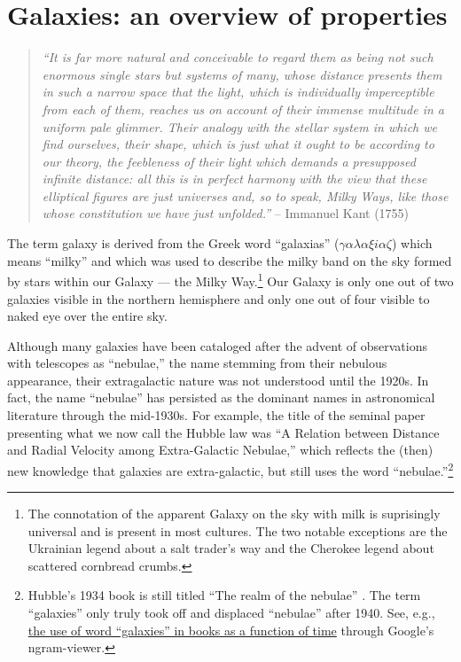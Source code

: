 \chapter{Galaxies: an overview of properties}
\label{ch:overview}
\begin{quote}
{\it “It is far more natural and conceivable to regard them as being not such enormous single stars but systems of many, whose distance presents them in such a narrow space that the light, which is individually imperceptible from each of them, reaches us on account of their immense multitude in a uniform pale glimmer. Their analogy with the stellar system in which we find ourselves, their shape, which is just what it ought to be according to our theory, the feebleness of their light which demands a presupposed infinite distance: all this is in perfect harmony with the view that these elliptical figures are just universes and, so to speak, Milky Ways, like those whose constitution we have just unfolded.”}  -- Immanuel Kant (1755)
\end{quote}

The term galaxy is derived from the Greek word ``galaxias'' ($\gamma\alpha\lambda\alpha\xi i\alpha\zeta$) which means ``milky'' and which was used to describe the milky band on the sky formed by stars within our Galaxy --- the Milky Way.\footnote{The connotation of the apparent Galaxy on the sky with milk is suprisingly universal and is present in most cultures. The two notable exceptions are the Ukrainian legend about a salt trader's way and the Cherokee legend about scattered cornbread crumbs. } Our Galaxy is only one out of two galaxies visible in the northern hemisphere and only one out of four visible to naked eye over the entire sky. 

Although many galaxies have been cataloged after the advent of observations with telescopes as ``nebulae,'' the name stemming from their nebulous appearance, their extragalactic nature was not understood until the 1920s. In fact, the name ``nebulae'' has persisted as the dominant names in astronomical literature through the mid-1930s. For example, the title of the seminal \href{http://adsabs.harvard.edu/abs/1929PNAS...15..168H}{\citet{hubble29}} paper presenting what we now call the Hubble law was  ``A Relation between Distance and Radial Velocity among Extra-Galactic Nebulae,'' which 
reflects the (then) new knowledge that galaxies are extra-galactic, but still uses the word ``nebulae.''\footnote{Hubble's 1934 book is still titled ``The realm of the nebulae'' \citep{hubble34}. The term ``galaxies'' only truly took off and displaced ``nebulae'' after 1940. See, e.g., \href{https://books.google.com/ngrams/graph?content=galaxies}{the use of word ``galaxies'' in books as a function of time} through Google's ngram-viewer.} 


